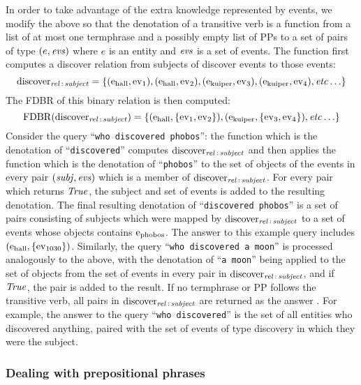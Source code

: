 \documentclass[../main.tex]{subfiles}
\begin{document}
\begin{refsection}
In order to take advantage of the extra knowledge represented by events, we modify the above so
that the denotation of a transitive verb is a function from a list of at most one termphrase and a possibly empty list of PPs to a set of pairs of type $(e,\operatorname{\mathit{evs}})$ where $e$ is an entity and $\operatorname{\mathit{evs}}$ is a set of events.
The function first computes a discover relation from subjects of discover events to those events:
\begin{equation*}
	\operatorname{discover}_{\operatorname{\mathit{rel}}\,:\,\operatorname{\mathit{subject}}} = \{ (\mathrm{e}_{\operatorname{hall}}, \operatorname{ev}_{1}), (\mathrm{e}_{\operatorname{hall}}, \operatorname{ev}_{2}), (\mathrm{e}_{\operatorname{kuiper}}, \operatorname{ev}_{3}), (\mathrm{e}_{\operatorname{kuiper}}, \operatorname{ev}_{4}), \operatorname{\mathit{etc\ldots}} \}
\end{equation*}
The FDBR of this binary relation is then computed:
\begin{equation*}
	\operatorname{FDBR}({\operatorname{discover}_{\operatorname{\mathit{rel}}\,:\,\operatorname{\mathit{subject}}}}) = \{(\mathrm{e}_{\operatorname{hall}}, \{\operatorname{ev}_{1}, \operatorname{ev}_{2}\}), (\mathrm{e}_{\operatorname{kuiper}}, \{\operatorname{ev}_{3}, \operatorname{ev}_{4}\}), \operatorname{\mathit{etc\ldots}} \}
\end{equation*}
Consider the query ``\texttt{who discovered phobos}'': the function which is the denotation
of ``\texttt{discovered}'' computes $\operatorname{discover}_{\operatorname{\mathit{rel}}\,:\,\operatorname{\mathit{subject}}}$ and then applies the function which is the
denotation of ``\texttt{phobos}'' to the set of objects of the events in every pair $(\operatorname{\mathit{subj}},\operatorname{\mathit{evs}})$ which is a
member of $\operatorname{discover}_{\operatorname{\mathit{rel}}\,:\,\operatorname{\mathit{subject}}}$. For every pair which returns $\operatorname{\mathit{True}}$, the subject and set of events is
added to the resulting denotation. The final resulting denotation of
``\texttt{discovered phobos}'' is a set of pairs consisting of subjects which were mapped by
$\operatorname{discover}_{\operatorname{\mathit{rel}}\,:\,\operatorname{\mathit{subject}}}$ to a set of events whose objects contains $\mathrm{e}_{\operatorname{phobos}}$. The answer to this example query includes $(\mathrm{e}_{\operatorname{hall}}, \{\operatorname{ev}_{1030}\})$. Similarly, the query ``\texttt{who
discovered a moon}'' is processed analogously to the above, with the denotation of ``\texttt{a moon}''
being applied to the set of objects from the set of events in every pair in $\operatorname{discover}_{\operatorname{\mathit{rel}}\,:\,\operatorname{\mathit{subject}}}$,
and if $\operatorname{\mathit{True}}$, the pair is added to the result.
If no termphrase or PP follows the transitive verb, all pairs in $\operatorname{discover}_{\operatorname{\mathit{rel}}\,:\,\operatorname{\mathit{subject}}}$
are returned as the answer . For example, the answer to the query ``\texttt{who discovered}'' is the set of
all entities who discovered anything, paired with the set of events of type discovery in which
they were the subject.

\subsubsection{Dealing with prepositional phrases}


\end{refsection}
\end{document}
